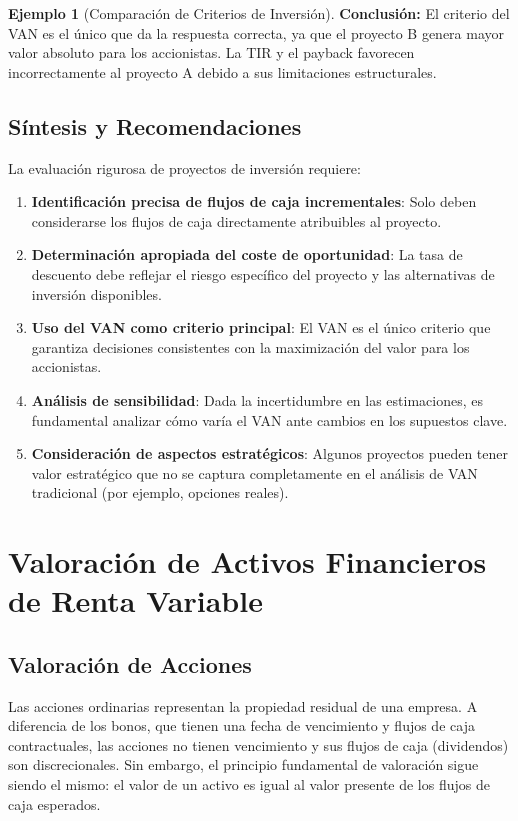 \documentclass[12pt,a4paper]{article}
\theoremstyle{definition}
\newtheorem{ejemplo}{Ejemplo}[section]
\begin{document}
\begin{ejemplo}[Comparación de Criterios de Inversión]
\textbf{Conclusión:} El criterio del VAN es el único que da la respuesta correcta, ya que el proyecto B genera mayor valor absoluto para los accionistas. La TIR y el payback favorecen incorrectamente al proyecto A debido a sus limitaciones estructurales.
\end{ejemplo}

\subsection{Síntesis y Recomendaciones}

La evaluación rigurosa de proyectos de inversión requiere:

\begin{enumerate}
\item \textbf{Identificación precisa de flujos de caja incrementales}: Solo deben considerarse los flujos de caja directamente atribuibles al proyecto.

\item \textbf{Determinación apropiada del coste de oportunidad}: La tasa de descuento debe reflejar el riesgo específico del proyecto y las alternativas de inversión disponibles.

\item \textbf{Uso del VAN como criterio principal}: El VAN es el único criterio que garantiza decisiones consistentes con la maximización del valor para los accionistas.

\item \textbf{Análisis de sensibilidad}: Dada la incertidumbre en las estimaciones, es fundamental analizar cómo varía el VAN ante cambios en los supuestos clave.

\item \textbf{Consideración de aspectos estratégicos}: Algunos proyectos pueden tener valor estratégico que no se captura completamente en el análisis de VAN tradicional (por ejemplo, opciones reales).
\end{enumerate}

\section{Valoración de Activos Financieros de Renta Variable}

\subsection{Valoración de Acciones}

Las acciones ordinarias representan la propiedad residual de una empresa. A diferencia de los bonos, que tienen una fecha de vencimiento y flujos de caja contractuales, las acciones no tienen vencimiento y sus flujos de caja (dividendos) son discrecionales. Sin embargo, el principio fundamental de valoración sigue siendo el mismo: el valor de un activo es igual al valor presente de los flujos de caja esperados.
\end{document}

